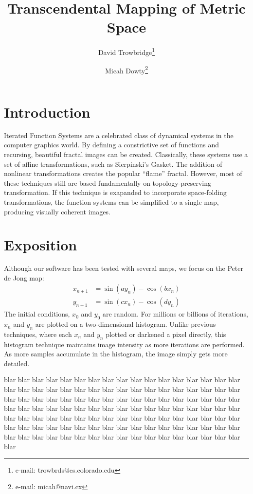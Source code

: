 \documentclass{acmsiggraph}
\title{Transcendental Mapping of Metric Space}
\author{
  David Trowbridge\thanks{e-mail: trowbrds@cs.colorado.edu}
\and
  Micah Dowty\thanks{e-mail: micah@navi.cx}
}
\begin{document}
\maketitle

\section{Introduction}
Iterated Function Systems are a celebrated class of dynamical systems in the
computer graphics world. By defining a constrictive set of functions and
recursing, beautiful fractal images can be created. Classically, these
systems use a set of affine transformations, such as Sierpinski's Gasket.
The addition of nonlinear transformations creates the popular ``flame''
fractal. However, most of these techniques still are based fundamentally
on topology-preserving transformation. If this technique is exapanded to
incorporate space-folding transformations, the function systems can be
simplified to a single map, producing visually coherent images.


\section{Exposition}
Although our software has been tested with several maps, we focus
on the Peter de Jong map:
\begin{eqnarray*}
  x_{n+1} &= \sin (a y_n) - \cos (b x_n) \\
  y_{n+1} &= \sin (c x_n) - \cos (d y_n)
\end{eqnarray*}
The initial conditions, $x_0$ and $y_0$ are random. For millions or billions
of iterations, $x_n$ and $y_n$ are plotted on a two-dimensional histogram.
Unlike previous techniques, where each $x_n$ and $y_n$ plotted or darkened
a pixel directly, this histogram technique maintains image intensity as
more iterations are performed. As more samples accumulate in the histogram,
the image simply gets more detailed.



blar blar blar blar blar blar blar blar blar blar blar blar blar blar blar
blar blar blar blar blar blar blar blar blar blar blar blar blar blar blar
blar blar blar blar blar blar blar blar blar blar blar blar blar blar blar
blar blar blar blar blar blar blar blar blar blar blar blar blar blar blar
blar blar blar blar blar blar blar blar blar blar blar blar blar blar blar
blar blar blar blar blar blar blar blar blar blar blar blar blar blar blar
blar blar blar blar blar blar blar blar blar blar blar blar blar blar blar
blar blar blar blar blar blar blar blar blar blar blar blar blar blar blar
\end{document}

